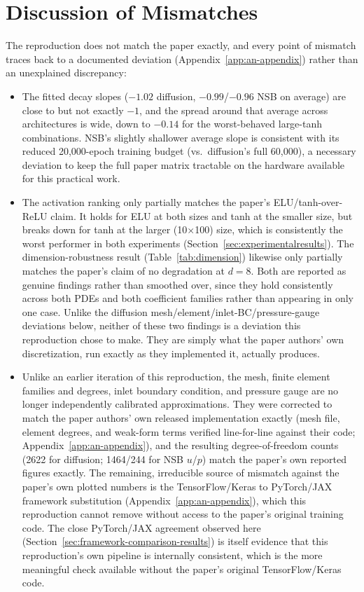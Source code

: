 \section{Discussion of Mismatches}

The reproduction does not match the paper exactly, and every point of
mismatch traces back to a documented deviation
(Appendix~\ref{app:an-appendix}) rather than an unexplained discrepancy:

\begin{itemize}
    \item The fitted decay slopes ($-1.02$ diffusion, $-0.99$/$-0.96$ NSB
    on average) are close to but not exactly $-1$, and the spread around
    that average across architectures is wide, down to $-0.14$ for the
    worst-behaved large-tanh combinations. NSB's slightly shallower average
    slope is consistent with its reduced 20{,}000-epoch training budget
    (vs.\ diffusion's full 60{,}000), a necessary deviation to keep the
    full paper matrix tractable on the hardware available for this
    practical work.
    \item The activation ranking only partially matches the paper's
    ELU/tanh-over-ReLU claim. It holds for ELU at both sizes and tanh at
    the smaller size, but breaks down for tanh at the larger
    (10$\times$100) size, which is consistently the worst performer in
    both experiments (Section~\ref{sec:experimentalresults}). The
    dimension-robustness result (Table~\ref{tab:dimension}) likewise only
    partially matches the paper's claim of no degradation at $d=8$. Both
    are reported as genuine findings rather than smoothed over, since they
    hold consistently across both PDEs and both coefficient families
    rather than appearing in only one case. Unlike the diffusion
    mesh/element/inlet-BC/pressure-gauge deviations below, neither of
    these two findings is a deviation this reproduction chose to make.
    They are simply what the paper authors' own discretization, run
    exactly as they implemented it, actually produces.
    \item Unlike an earlier iteration of this reproduction, the mesh,
    finite element families and degrees, inlet boundary condition, and
    pressure gauge are no longer independently calibrated approximations.
    They were corrected to match the paper authors' own released
    implementation exactly (mesh file, element degrees, and weak-form
    terms verified line-for-line against their code;
    Appendix~\ref{app:an-appendix}), and the resulting degree-of-freedom
    counts (2622 for diffusion; 1464/244 for NSB $u$/$p$) match the
    paper's own reported figures exactly. The remaining, irreducible
    source of mismatch against the paper's own plotted numbers is the
    TensorFlow/Keras to PyTorch/JAX framework substitution
    (Appendix~\ref{app:an-appendix}), which this reproduction cannot
    remove without access to the paper's original training code. The
    close PyTorch/JAX agreement observed here
    (Section~\ref{sec:framework-comparison-results}) is itself evidence
    that this reproduction's own pipeline is internally consistent, which
    is the more meaningful check available without the paper's original
    TensorFlow/Keras code.
\end{itemize}
